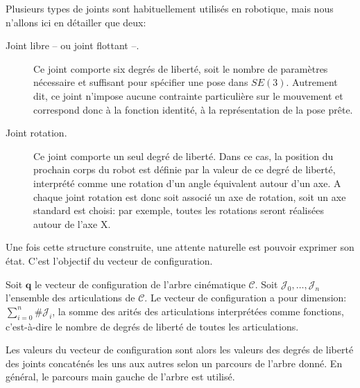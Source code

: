 Plusieurs types de joints sont habituellement utilisés en robotique,
mais nous n'allons ici en détailler que deux:
\begin{description}
\item[Joint libre -- ou joint flottant --.] Ce joint
  comporte six degrés de liberté, soit le nombre de paramètres
  nécessaire et suffisant pour spécifier une pose dans
  $SE(3)$. Autrement dit, ce joint n'impose aucune contrainte
  particulière sur le mouvement et correspond donc à la fonction
  identité, à la représentation de la pose prête.
\item[Joint rotation.] Ce joint comporte un seul
  degré de liberté. Dans ce cas, la position du prochain corps du
  robot est définie par la valeur de ce degré de liberté, interprété
  comme une rotation d'un angle équivalent autour d'un axe. A chaque
  joint rotation est donc soit associé un axe de rotation, soit un axe
  standard est choisi: par exemple, toutes les rotations seront
  réalisées autour de l'axe X.
\end{description}


Une fois cette structure construite, une attente naturelle est pouvoir
exprimer son état. C'est l'objectif du vecteur de
configuration.

\begin{mydef}
  Soit $\mathbf{q}$ le vecteur de configuration de l'arbre cinématique
  $\mathcal{C}$. Soit $\mathcal{J}_0, \dotsc, \mathcal{J}_n$
  l'ensemble des articulations de $\mathcal{C}$. Le vecteur de
  configuration a pour dimension: $\sum_{i=0}^n \#\mathcal{J}_i$, la
  somme des arités des articulations interprétées comme fonctions,
  c'est-à-dire le nombre de degrés de liberté de toutes les
  articulations.


  Les valeurs du vecteur de configuration sont alors les valeurs des
  degrés de liberté des joints concaténés les uns aux autres selon un
  parcours de l'arbre donné. En général, le parcours main gauche de
  l'arbre est utilisé.
\end{mydef}

